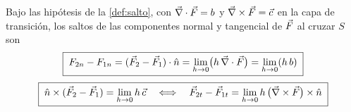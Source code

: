 \begin{teorema}\label{teo:contorno}
Bajo las hipótesis de la \cref{def:salto}, con $\vec{\nabla}\cdot\vec{F}=b$ y $\vec{\nabla}\times\vec{F}=\vec{c}$ en la capa de transición, los saltos de las componentes normal y
tangencial de $\vec{F}$ al cruzar $S$ son
\begin{equation}\label{eq:contorno-normal}
  \boxed{\;F_{2n}-F_{1n}=(\vec{F}_2-\vec{F}_1)\cdot\hat{n}=\lim_{h\to0}\bigl(h\,\vec{\nabla}\cdot\vec{F}\bigr)=\lim_{h\to0}(h\,b)\;}
\end{equation}
\begin{equation}\label{eq:contorno-tangencial}
  \boxed{\;\hat{n}\times(\vec{F}_2-\vec{F}_1)=\lim_{h\to0}h\,\vec{c}\quad\Longleftrightarrow\quad
  \vec{F}_{2t}-\vec{F}_{1t}=\lim_{h\to0}h\,\bigl(\vec{\nabla}\times\vec{F}\bigr)\times\hat{n}\;}
\end{equation}
\end{teorema}

